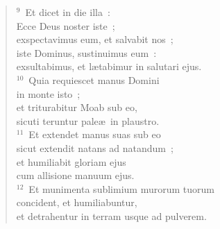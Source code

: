 \begin{flushleft}\begin{verse}${}^{9}$~Et dicet in die illa~:\\ Ecce Deus noster iste~;\\ exspectavimus eum, et salvabit nos~;\\ iste Dominus, sustinuimus eum~:\\ exsultabimus, et l\ae tabimur in salutari ejus.\\
${}^{10}$~Quia requiescet manus Domini\\ in monte isto~;\\ et triturabitur Moab sub eo,\\ sicuti teruntur pale\ae\ in plaustro.\\
${}^{11}$~Et extendet manus suas sub eo\\ sicut extendit natans ad natandum~;\\ et humiliabit gloriam ejus\\ cum allisione manuum ejus.\\
${}^{12}$~Et munimenta sublimium murorum tuorum\\ concident, et humiliabuntur,\\ et detrahentur in terram usque ad pulverem.\end{verse}\end{flushleft}


